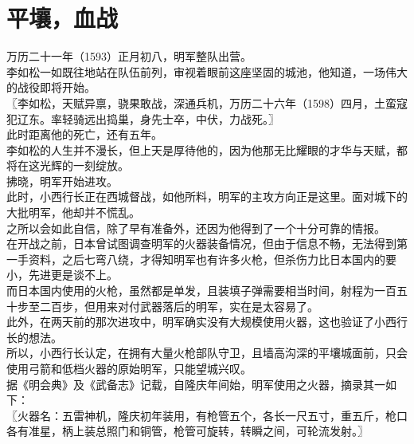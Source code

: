 \section{平壤，血战}
\ifnum{}
	\begin{multicols}{\theparacolNo}
\fi
万历二十一年（1593）正月初八，明军整队出营。\\

李如松一如既往地站在队伍前列，审视着眼前这座坚固的城池，他知道，一场伟大的战役即将开始。\\

〖李如松，天赋异禀，骁果敢战，深通兵机，万历二十六年（1598）四月，土蛮寇犯辽东。率轻骑远出捣巢，身先士卒，中伏，力战死。〗\\

此时距离他的死亡，还有五年。\\

李如松的人生并不漫长，但上天是厚待他的，因为他那无比耀眼的才华与天赋，都将在这光辉的一刻绽放。\\

拂晓，明军开始进攻。\\

此时，小西行长正在西城督战，如他所料，明军的主攻方向正是这里。面对城下的大批明军，他却并不慌乱。\\

之所以会如此自信，除了早有准备外，还因为他得到了一个十分可靠的情报。\\

在开战之前，日本曾试图调查明军的火器装备情况，但由于信息不畅，无法得到第一手资料，之后七弯八绕，才得知明军也有许多火枪，但杀伤力比日本国内的要小，先进更是谈不上。\\

而日本国内使用的火枪，虽然都是单发，且装填子弹需要相当时间，射程为一百五十步至二百步，但用来对付武器落后的明军，实在是太容易了。\\

此外，在两天前的那次进攻中，明军确实没有大规模使用火器，这也验证了小西行长的想法。\\

所以，小西行长认定，在拥有大量火枪部队守卫，且墙高沟深的平壤城面前，只会使用弓箭和低档火器的原始明军，只能望城兴叹。\\

据《明会典》及《武备志》记载，自隆庆年间始，明军使用之火器，摘录其一如下：\\

〖火器名：五雷神机，隆庆初年装用，有枪管五个，各长一尺五寸，重五斤，枪口各有准星，柄上装总照门和铜管，枪管可旋转，转瞬之间，可轮流发射。〗\\


\end{multicols}
